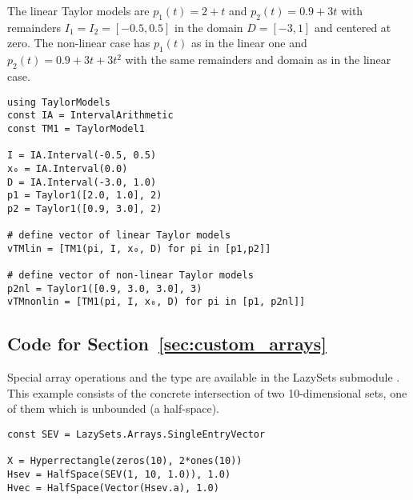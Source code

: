 The linear Taylor models are $p_1(t) = 2 + t$ and $p_2(t) = 0.9 + 3t$ with remainders $I_1 = I_2 = [-0.5, 0.5]$ in the domain $D = [-3, 1]$ and centered at zero.
%
The non-linear case has $p_1(t)$ as in the linear one and $p_2(t) = 0.9 + 3t + 3t^2$ with the same remainders and domain as in the linear case.

\begin{minipage}{\linewidth}
\vspace{-\abovedisplayskip}
\begin{lstlisting}
using TaylorModels
const IA = IntervalArithmetic
const TM1 = TaylorModel1

I = IA.Interval(-0.5, 0.5)
x₀ = IA.Interval(0.0)
D = IA.Interval(-3.0, 1.0)
p1 = Taylor1([2.0, 1.0], 2)
p2 = Taylor1([0.9, 3.0], 2)

# define vector of linear Taylor models
vTMlin = [TM1(pi, I, x₀, D) for pi in [p1,p2]]

# define vector of non-linear Taylor models
p2nl = Taylor1([0.9, 3.0, 3.0], 3)
vTMnonlin = [TM1(pi, I, x₀, D) for pi in [p1, p2nl]]
\end{lstlisting}
\end{minipage}

\subsection{Code for Section~\ref{sec:custom_arrays}}

Special array operations and the type  are available in the LazySets submodule . This example consists of the concrete intersection of two 10-dimensional sets, one of them which is unbounded (a half-space).

\begin{minipage}{\linewidth}
\vspace{-\abovedisplayskip}
\begin{lstlisting}
const SEV = LazySets.Arrays.SingleEntryVector

X = Hyperrectangle(zeros(10), 2*ones(10))
Hsev = HalfSpace(SEV(1, 10, 1.0)), 1.0)
Hvec = HalfSpace(Vector(Hsev.a), 1.0)
\end{lstlisting}
\end{minipage}





